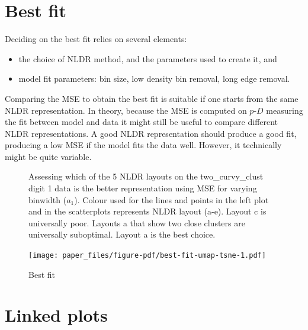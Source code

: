 \documentclass[
  12pt]{article}
\providecommand{\tightlist}{%
  \setlength{\itemsep}{0pt}\setlength{\parskip}{0pt}}\usepackage{longtable,booktabs,array}
\def\tightlist{}
\newcommand\pD{$p\text{-}D$}
\begin{document}
\section{Best fit}\label{best-fit}

Deciding on the best fit relies on several elements:

\begin{itemize}
\tightlist
\item
  the choice of NLDR method, and the parameters used to create it, and
\item
  model fit parameters: bin size, low density bin removal, long edge
  removal.
\end{itemize}

Comparing the MSE to obtain the best fit is suitable if one starts from
the same NLDR representation. In theory, because the MSE is computed on
\pD{} measuring the fit between model and data it might still be useful
to compare different NLDR representations. A good NLDR representation
should produce a good fit, producing a low MSE if the model fits the
data well. However, it technically might be quite variable.

\begin{figure}[H]


\caption{\label{fig-two_curvy_clust-mse}Assessing which of the 5 NLDR
layouts on the two\_curvy\_clust digit 1 data is the better
representation using MSE for varying binwidth (\(a_1\)). Colour used for
the lines and points in the left plot and in the scatterplots represents
NLDR layout (a-e). Layout c is universally poor. Layouts a that show two
close clusters are universally suboptimal. Layout a is the best choice.}

\end{figure}%

\begin{figure}[H]

{\centering \texttt{[image: paper\_files/figure-pdf/best-fit-umap-tsne-1.pdf]}

}

\caption{Best fit}

\end{figure}%

\section{Linked plots}\label{linked-plots}
\end{document}

